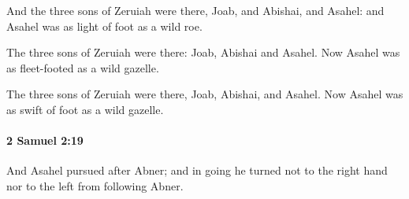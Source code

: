 			\begin{versebox}
					\item[BHS] 
					\item[ASV] And the three sons of Zeruiah were there, Joab, and Abishai, and Asahel: and Asahel was as light of foot as a wild roe.
					\item[NIV] The three sons of Zeruiah were there: Joab, Abishai and Asahel. Now Asahel was as fleet-footed as a wild gazelle.
					\item[NRSV] The three sons of Zeruiah were there, Joab, Abishai, and Asahel. Now Asahel was as swift of foot as a wild gazelle.
			\end{versebox}

		\paragraph{2 Samuel 2:19} %
			\label{2SAMUEL-2-19}

			And Asahel pursued after Abner; and in going he turned not to the right hand nor to the left from following Abner.

